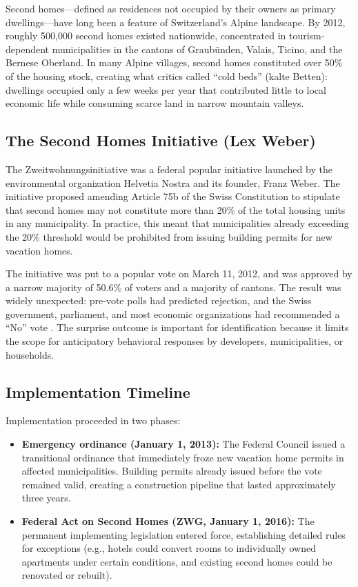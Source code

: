 \documentclass[12pt]{article}
\begin{document}
Second homes---defined as residences not occupied by their owners as primary dwellings---have long been a feature of Switzerland's Alpine landscape. By 2012, roughly 500,000 second homes existed nationwide, concentrated in tourism-dependent municipalities in the cantons of Graub\"{u}nden, Valais, Ticino, and the Bernese Oberland. In many Alpine villages, second homes constituted over 50\% of the housing stock, creating what critics called ``cold beds'' (kalte Betten): dwellings occupied only a few weeks per year that contributed little to local economic life while consuming scarce land in narrow mountain valleys.

\subsection{The Second Homes Initiative (Lex Weber)}

The Zweitwohnungsinitiative was a federal popular initiative launched by the environmental organization Helvetia Nostra and its founder, Franz Weber. The initiative proposed amending Article 75b of the Swiss Constitution to stipulate that second homes may not constitute more than 20\% of the total housing units in any municipality. In practice, this meant that municipalities already exceeding the 20\% threshold would be prohibited from issuing building permits for new vacation homes.

The initiative was put to a popular vote on March 11, 2012, and was approved by a narrow majority of 50.6\% of voters and a majority of cantons. The result was widely unexpected: pre-vote polls had predicted rejection, and the Swiss government, parliament, and most economic organizations had recommended a ``No'' vote \citep{hilber2020economic}. The surprise outcome is important for identification because it limits the scope for anticipatory behavioral responses by developers, municipalities, or households.

\subsection{Implementation Timeline}

Implementation proceeded in two phases:

\begin{itemize}
    \item \textbf{Emergency ordinance (January 1, 2013):} The Federal Council issued a transitional ordinance that immediately froze new vacation home permits in affected municipalities. Building permits already issued before the vote remained valid, creating a construction pipeline that lasted approximately three years.
    \item \textbf{Federal Act on Second Homes (ZWG, January 1, 2016):} The permanent implementing legislation entered force, establishing detailed rules for exceptions (e.g., hotels could convert rooms to individually owned apartments under certain conditions, and existing second homes could be renovated or rebuilt).
\end{itemize}
\end{document}
